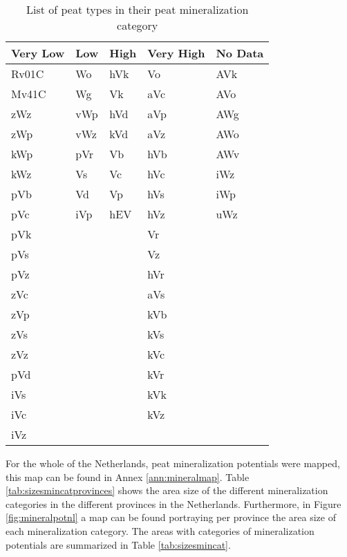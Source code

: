 {\begin{table}[htbp]
\caption{List of peat types in their peat mineralization category}
\begin{center}
\begin{tabular}{|p{3cm}|p{3cm}|p{3cm}|p{3cm}|p{3cm}|}
\hline
Very Low & Low & High & Very High & No Data \\ \hline
Rv01C & Wo & hVk & Vo & AVk \\ \hline
Mv41C & Wg & Vk & aVc & AVo \\ \hline
zWz & vWp & hVd & aVp & AWg \\ \hline
zWp & vWz & kVd & aVz & AWo \\ \hline
kWp & pVr & Vb & hVb & AWv \\ \hline
kWz & Vs & Vc & hVc & iWz \\ \hline
pVb & Vd & Vp & hVs & iWp \\ \hline
pVc & iVp & hEV & hVz & uWz \\ \hline
pVk &  &  & Vr &  \\ \hline
pVs &  &  & Vz &  \\ \hline
pVz &  &  & hVr &  \\ \hline
zVc &  &  & aVs &  \\ \hline
zVp &  &  & kVb &  \\ \hline
zVs &  &  & kVs &  \\ \hline
zVz &  &  & kVc &  \\ \hline
pVd &  &  & kVr &  \\ \hline
iVs &  &  & kVk &  \\ \hline
iVc &  &  & kVz &  \\ \hline
iVz &  &  &  &  \\ \hline
\end{tabular}
\end{center}
\label{tab:minpotcategories}
\end{table}

For the whole of the Netherlands, peat mineralization potentials were mapped, this map can be found in Annex \ref{ann:mineralmap}. Table \ref{tab:sizesmincatprovinces} shows the area size of the different mineralization categories in the different provinces in the Netherlands. Furthermore, in Figure \ref{fig:mineralpotnl} a map can be found portraying per province the area size of each mineralization category. The areas with categories of mineralization potentials are summarized in Table \ref{tab:sizesmincat}.

}

